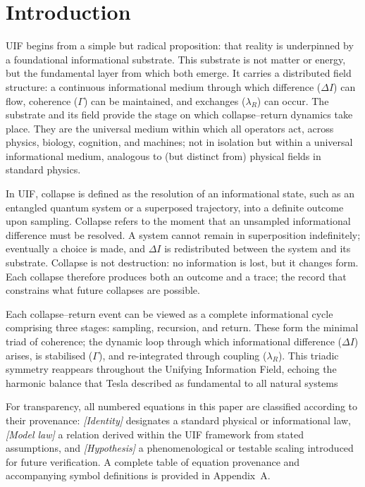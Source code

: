 \section{Introduction}

UIF begins from a simple but radical proposition: that reality is underpinned by a foundational informational substrate. This substrate is not matter or energy, but the fundamental layer from which both emerge. It carries a distributed field structure: a continuous informational medium through which difference ($\Delta I$) can flow, coherence ($\Gamma$) can be maintained, and exchanges ($\lambda_R$) can occur. The substrate and its field provide the stage on which collapse--return dynamics take place. They are the universal medium within which all operators act, across physics, biology, cognition, and machines; not in isolation but within a universal informational medium, analogous to (but distinct from) physical fields in standard physics.

In UIF, collapse is defined as the resolution of an informational state, such as an entangled quantum system or a superposed trajectory, into a definite outcome upon sampling. Collapse refers to the moment that an unsampled informational difference must be resolved. A system cannot remain in superposition indefinitely; eventually a choice is made, and $\Delta I$ is redistributed between the system and its substrate. Collapse is not destruction: no information is lost, but it changes form. Each collapse therefore produces both an outcome and a trace; the record that constrains what future collapses are possible.

 Each collapse--return event can be viewed as a complete informational cycle comprising three stages: sampling, recursion, and return. These form the minimal triad of coherence; the dynamic loop through which informational difference ($\Delta I$) arises, is stabilised ($\Gamma$), and re-integrated through coupling ($\lambda_R$). This triadic symmetry reappears throughout the Unifying Information Field, echoing the harmonic balance that Tesla described as fundamental to all natural systems \cite{Tesla1892,Tesla1919,Cheney1981}
\newline

\noindent
For transparency, all numbered equations in this paper are classified according to their provenance:
\emph{[Identity]} designates a standard physical or informational law,
\emph{[Model law]} a relation derived within the UIF framework from stated assumptions,
and \emph{[Hypothesis]} a phenomenological or testable scaling introduced for future verification.
A complete table of equation provenance and accompanying symbol definitions
is provided in Appendix~A.
\newline

